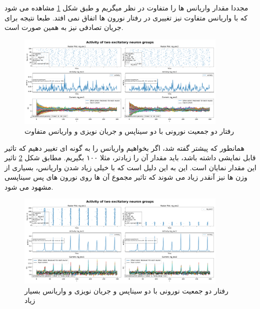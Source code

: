 \documentclass{report}
\begin{document}
            مجددا مقدار واریانس ها را متفاوت در نظر میگریم و طبق شکل
            \ref{fig:part2-two-ng-full-synapse-diff-variance-rand-curr}
            مشاهده می شود که با واریانس متفاوت نیز تغییری در رفتار نورون ها اتفاق نمی افتد. طبعا نتیجه برای جریان تصادفی نیز به همین صورت است.
            \begin{figure}[!ht]
                \centering
                \includegraphics[width=0.9\textwidth]{plots/part2-two-ng-full-synapse-diff-variance-rand-curr.pdf} 
                \caption{رفتار دو جمعیت نورونی با دو سیناپس و جریان نویزی و واریانس متفاوت}
                \label{fig:part2-two-ng-full-synapse-diff-variance-rand-curr}
            \end{figure}
            همانطور که پیشتر گفته شد، اگر بخواهیم واریانس را به گونه ای تغییر دهیم که تاثیر قابل نمایشی داشته باشد، باید مقدار آن را زیادتر، مثلا ۱۰۰ بگیریم. مطابق شکل 
            \ref{fig:part2-two-ng-full-synapse-very-high-variance-noise-curr}
            تاثیر این مقدار نمایان است. این به این دلیل است که با خیلی زیاد شدن واریانس، بسیاری از وزن ها نیز آنقدر زیاد می شوند که تاثیر مجموع آن ها روی نورون های پس سیناپسی مشهود می شود.
            \begin{figure}[!ht]
                \centering
                \includegraphics[width=0.9\textwidth]{plots/part2-two-ng-full-synapse-very-high-variance-noise-curr.pdf} 
                \caption{رفتار دو جمعیت نورونی با دو سیناپس و جریان نویزی و واریانس بسیار زیاد}
                \label{fig:part2-two-ng-full-synapse-very-high-variance-noise-curr}
            \end{figure}
            
\end{document}
